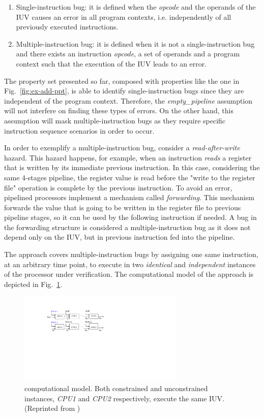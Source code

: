 \begin{enumerate}
\item Single-instruction bug: it is defined when the \textit{opcode} and the operands of the IUV causes an error in all program contexts, i.e. independently of all previously executed instructions.
\item Multiple-instruction bug: it is defined when it is not a single-instruction bug and there exists an instruction \textit{opcode}, a set of operands and a program context such that the execution of the IUV leads to an error.
\end{enumerate}

The property set presented so far, composed with properties like the one in Fig.~\ref{fig:ex-add-ppt}, is able to identify single-instruction bugs since they are independent of the program context. Therefore, the \textit{empty\_pipeline} assumption will not interfere on finding these types of errors. On the other hand, this assumption will mask multiple-instruction bugs as they require specific instruction sequence scenarios in order to occur.

In order to exemplify a multiple-instruction bug, consider a \textit{read-after-write} hazard. This hazard happens, for example, when an instruction \textit{reads} a register that is written by its immediate previous instruction. In this case, considering the same 4-stages pipeline, the register value is read before the "write to the register file" operation is complete by the previous instruction. To avoid an error, pipelined processors implement a mechanism called \textit{forwarding}. This mechanism forwards the value that is going to be written in the register file to previous pipeline stages, so it can be used by the following instruction if needed. A bug in the forwarding structure is considered a multiple-instruction bug as it does not depend only on the IUV, but in previous instruction fed into the pipeline. 

The \SSQED{} approach covers multiple-instruction bugs by assigning one same instruction, at an arbitrary time point, to execute in two \textit{identical} and \textit{independent} instances of the processor under verification. The computational model of the \SSQED{} approach is depicted in Fig.~\ref{fig:s2qed-model}.

\begin{figure}[htb!]
	\centering
	\includegraphics[width=0.7\textwidth]{images/s2qed_model.pdf}
	\caption{\SSQED{} computational model. Both constrained and unconstrained instances, \textit{CPU1} and \textit{CPU2} respectively, execute the same IUV. (Reprinted from \cite{paper-gapfree})}
	\label{fig:s2qed-model}
\end{figure}

